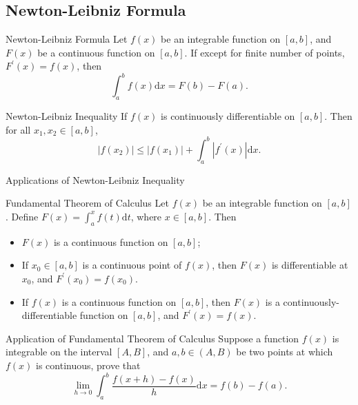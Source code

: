 \subsection{Newton-Leibniz Formula}

\begin{theorem}{Newton-Leibniz Formula}{}
  Let $f(x)$ be an integrable function on $[a, b]$,
  and $F(x)$ be a continuous function on $[a, b]$.
  If except for finite number of points,
  $F^{\prime}(x) = f(x)$, then
  \begin{equation}
    \int_a^b f(x) \mathrm{d} x = F(b) - F(a).
  \end{equation}
\end{theorem}

\begin{corollary}{Newton-Leibniz Inequality}{}
  If $f(x)$ is continuously differentiable on $[a, b]$.
  Then for all $x_1, x_2 \in [a, b]$, 
  \begin{equation}
    |f(x_2)| \leq |f(x_1)| + \int_a^b |f^{\prime}(x)|\mathrm{d} x.
  \end{equation}
\end{corollary}

\begin{example}{Applications of Newton-Leibniz Inequality}{}
  
\end{example}

\begin{theorem}{Fundamental Theorem of Calculus}{}
  Let $f(x)$ be an integrable function on $[a, b]$.
  Define $F(x) = \int_a^x f(t)\mathrm{d} t$,
  where $x \in [a, b]$. Then
  \begin{itemize}
  \item $F(x)$ is a continuous function on $[a, b]$;
  \item If $x_0 \in [a, b]$ is a continuous point of $f(x)$,
    then $F(x)$ is differentiable at $x_0$,
    and $F^{\prime}(x_0) = f(x_0)$.
  \item If $f(x)$ is a continuous function on $[a, b]$,
    then $F(x)$ is a continuously-differentiable function on $[a, b]$,
    and $F^{\prime}(x) = f(x)$.
  \end{itemize}
\end{theorem}

\begin{example}{Application of Fundamental Theorem of Calculus}{}
  Suppose a function $f(x)$ is integrable on the interval $[A, B]$,
  and $a, b \in (A, B)$ be two points at which $f(x)$ is continuous, prove that
  \begin{equation}
    \lim \limits _{h \rightarrow 0} \int_a^b \frac{f(x+h) - f(x)}{h}\mathrm{d} x = f(b) - f(a).
  \end{equation}
\end{example}

